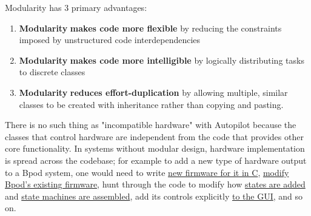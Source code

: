 Modularity has 3 primary advantages:
\begin{enumerate}
    \item \textbf{Modularity} \textbf{makes code more flexible} by reducing the constraints imposed by unstructured code interdependencies
    \item \textbf{Modularity} \textbf{makes code more intelligible} by logically distributing tasks to discrete classes
    \item \textbf{Modularity} \textbf{reduces effort-duplication} by allowing multiple, similar classes to be created with inheritance rather than copying and pasting.
\end{enumerate}

There is no such thing as "incompatible hardware" with Autopilot because the classes that control hardware are independent from the code that provides other core functionality. In systems without modular design, hardware implementation is spread across the codebase; for example to add a new type of hardware output to a Bpod system, one would need to write \href{https://github.com/sanworks/Bpod_Gen2/blob/master/FIRMWARE\%20README.txt}{new firmware for it in C}, \href{https://github.com/sanworks/Bpod_StateMachine_Firmware/blob/v22/Preconfigured/StateMachine-Bpod2_0/StateMachine-Bpod2_0.ino}{modify Bpod's existing firmware}, hunt through the code to modify how \href{https://github.com/sanworks/Bpod_Gen2/blob/71f3a256b68926b65eae71e10fd747bd28e7ba7d/Functions/State\%20Machine\%20Assembler/AddState.m#L170}{states are added} and \href{https://github.com/sanworks/Bpod_Gen2/blob/71f3a256b68926b65eae71e10fd747bd28e7ba7d/Functions/\%40BpodObject/SetupStateMachine.m#L123}{state machines are assembled}, add its controls explicitly \href{https://github.com/sanworks/Bpod_Gen2/blob/71f3a256b68926b65eae71e10fd747bd28e7ba7d/Functions/Override\%20Panels/StateMachinePanel_2_0_0.m}{to the GUI}, and so on. 

